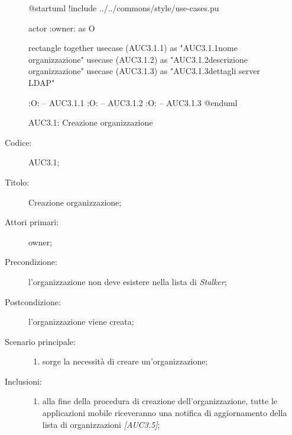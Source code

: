 \documentclass[../../../analisi-dei-requisiti.tex]{subfiles}
\begin{document}
\begin{figure}[H]
  \centering
  \begin{plantuml}
    @startuml
    !include ../../commons/style/use-cases.pu

    actor :owner: as O

    rectangle {
        together {
            usecase (AUC3.1.1) as "AUC3.1.1\nInserisci nome organizzazione"
            usecase (AUC3.1.2) as "AUC3.1.2\nInserisci descrizione organizzazione"
            usecase (AUC3.1.3) as "AUC3.1.3\nConfigurazione dettagli server LDAP"
          }
      }

    :O: -- AUC3.1.1
    :O: -- AUC3.1.2
    :O: -- AUC3.1.3
    @enduml
  \end{plantuml}
  \caption{AUC3.1: Creazione organizzazione}%
  \label{fig:AUC3_1}
\end{figure}

\begin{description}
  \item[Codice:] AUC3.1;
  \item[Titolo:] Creazione organizzazione;
  \item[Attori primari:] owner;
  \item[Precondizione:] l'organizzazione non deve esistere nella lista di \emph{Stalker};
  \item[Postcondizione:] l'organizzazione viene creata;
  \item[Scenario principale:]
        \begin{enumerate}
          \item sorge la necessità di creare un'organizzazione;
        \end{enumerate}
  \item[Inclusioni:]
        \begin{enumerate}
          \item alla fine della procedura di creazione dell'organizzazione, tutte le applicazioni mobile riceveranno una notifica di aggiornamento
                della lista di organizzazioni \emph{[AUC3.5]};
        \end{enumerate}
\end{description}
\end{document}
